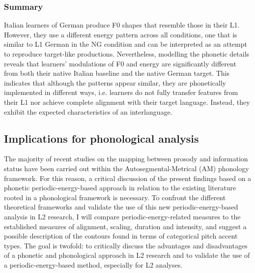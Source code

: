 \subsubsection{Summary}
\hypertarget{Toc191305915}{}\begin{styleStandard}
Italian learners of German produce F0 shapes that resemble those in their L1. However, they use a different energy pattern across all conditions, one that is similar to L1 German in the NG condition and can be interpreted as an attempt to reproduce target-like productions. Nevertheless, modelling the phonetic details reveals that learners’ modulations of F0 and energy are significantly different from both their native Italian baseline and the native German target. This indicates that although the patterns appear similar, they are phonetically implemented in different ways, i.e. learners do not fully transfer features from their L1 nor achieve complete alignment with their target language. Instead, they exhibit the expected characteristics of an interlanguage.
\end{styleStandard}

\subsection[Implications for phonological analysis]{Implications for phonological analysis}
\hypertarget{Toc191305916}{}\begin{styleStandard}
The majority of recent studies on the mapping between prosody and information status have been carried out within the Autosegmental-Metrical (AM) phonology framework. For this reason, a critical discussion of the present findings based on a phonetic periodic-energy-based approach in relation to the existing literature rooted in a phonological framework is necessary. To confront the different theoretical frameworks and validate the use of this new periodic-energy-based analysis in L2 research, I will compare periodic-energy-related measures to the established measures of alignment, scaling, duration and intensity, and suggest a possible description of the contours found in terms of categorical pitch accent types. The goal is twofold: to critically discuss the advantages and disadvantages of a phonetic and phonological approach in L2 research and to validate the use of a periodic-energy-based method, especially for L2 analyses.
\end{styleStandard}

